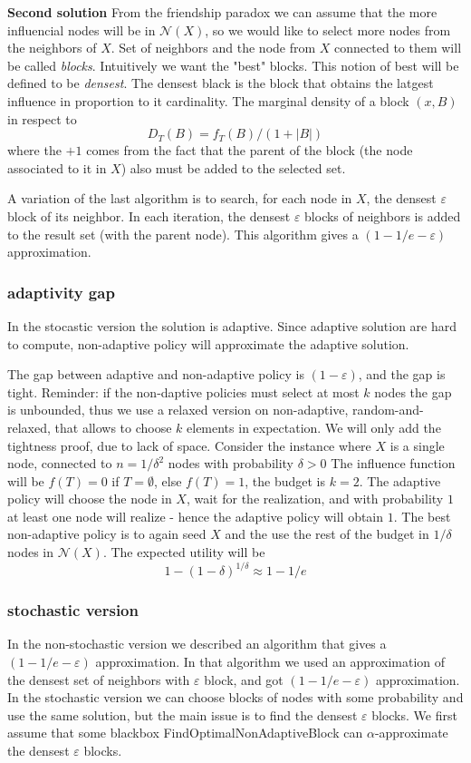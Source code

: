 \textbf{Second solution}
From the friendship paradox we can assume that the more influencial nodes will be in $\mathcal{N}(X)$, so we would like to select more nodes from the neighbors of $X$. Set of neighbors and the node from $X$ connected to them will be called \textit{blocks}. Intuitively we want the "best" blocks. This notion of best will be defined to be \textit{densest}. The densest black is the block that obtains the latgest influence in proportion to it cardinality. The marginal density of a block $(x,B)$ in respect to 
$$D_T(B)=f_T(B)/(1+|B|)$$ where the $+1$ comes from the fact that the parent of the block (the node associated to it in $X$) also must be added to the selected set.

 A variation of the last algorithm is to search, for each node in $X$, the densest $\varepsilon$ block of its neighbor. In each iteration, the densest $\varepsilon$ blocks of neighbors is added to the result set (with the parent node). This algorithm gives a $(1-1/e-\varepsilon)$ approximation.


\subsubsection{adaptivity gap}
In the stocastic version the solution is adaptive. Since adaptive solution are hard to compute, non-adaptive policy will approximate the adaptive solution.
 
The gap between adaptive and non-adaptive policy is $(1-\varepsilon)$, and the gap is tight. Reminder: if the non-daptive policies must select at most $k$ nodes the gap is unbounded, thus we use a relaxed version on non-adaptive, random-and-relaxed, that allows to choose $k$ elements in expectation. We will only add the tightness proof, due to lack of space.
Consider the instance where $X$ is a single node, connected to $n=1/\delta^2$ nodes with probability $\delta>0$
The influence function will be $f(T)=0$ if $T=\emptyset$, else $f(T)=1$, the budget is $k=2$.
The adaptive policy will choose the node in $X$, wait for the realization, and with probability $1$ at least one node will realize - hence the adaptive policy will obtain $1$. The best non-adaptive policy is to again seed $X$ and the use the rest of the budget in $1/\delta$ nodes in $\mathcal{N}(X)$. The expected utility will be $$1-(1-\delta)^{1/\delta}\approx 1-1/e$$

\subsubsection{stochastic version}
In the non-stochastic version we described an algorithm that gives a $(1-1/e-\varepsilon)$ approximation. In that algorithm we used an approximation of the densest set of neighbors with $\varepsilon$ block, and got  $(1-1/e-\varepsilon)$ approximation. In the stochastic version we can choose blocks of nodes with some probability and use the same solution, but the main issue is to find the densest $\varepsilon$ blocks.
We first assume that some blackbox FindOptimalNonAdaptiveBlock can $\alpha$-approximate the densest $\varepsilon$ blocks.


